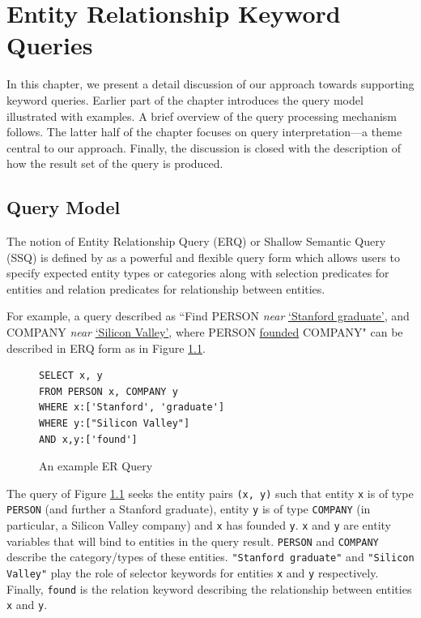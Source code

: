 \documentclass[a4paper, twoside, 12pt]{report}
\begin{document}
\chapter[ER Keyword Querying]{Entity Relationship Keyword Queries}

In this chapter, we present a detail discussion of our approach towards supporting keyword queries. Earlier part of the chapter introduces the query model illustrated with examples. A brief overview of the query processing mechanism follows. The latter half of the chapter focuses on query interpretation---a theme central to our approach. Finally, the discussion is closed with the description of how the result set of the query is produced.

\section{Query Model}

The notion of Entity Relationship Query (ERQ) or Shallow Semantic Query (SSQ) is defined by \cite{li2010structured, li2012entity} as a powerful and flexible query form which allows users to specify expected entity types or categories along with selection predicates for entities and relation predicates for relationship between entities.

For example, a query described as ``Find PERSON \emph{near} \underline{`Stanford graduate'}, and COMPANY \emph{near} \underline{`Silicon Valley'}, where PERSON \underline{founded} COMPANY" can be described in ERQ form as in Figure \ref{fig:erq}.

\begin{figure}[h!]
\centering
\begin{BVerbatim}
SELECT x, y
FROM PERSON x, COMPANY y
WHERE x:['Stanford', 'graduate']
WHERE y:["Silicon Valley"]
AND x,y:['found']
\end{BVerbatim}
\caption{An example ER Query}
\label{fig:erq}
\end{figure}

The query of Figure \ref{fig:erq} seeks the entity pairs \texttt{(x, y)} such that entity \texttt{x} is of type \texttt{PERSON} (and further a Stanford graduate), entity \texttt{y} is of type \texttt{COMPANY} (in particular, a Silicon Valley company) and \texttt{x} has founded \texttt{y}. \texttt{x} and \texttt{y} are entity variables that will bind to entities in the query result. \texttt{PERSON} and \texttt{COMPANY} describe the category/types of these entities. \texttt{"Stanford graduate"} and \texttt{"Silicon Valley"} play the role of selector keywords for entities \texttt{x} and \texttt{y} respectively. Finally, \texttt{found} is the relation keyword describing the relationship between entities \texttt{x} and \texttt{y}.
\end{document}
